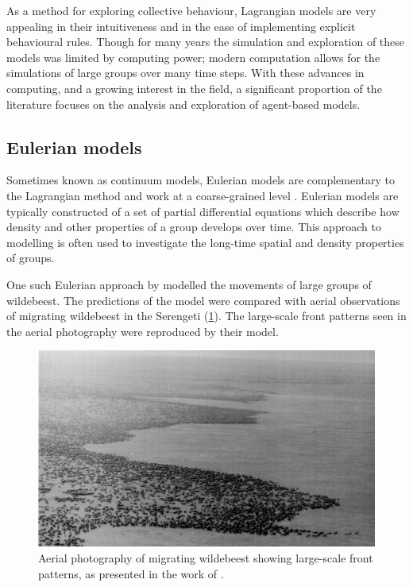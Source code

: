 As a method for exploring collective behaviour, Lagrangian models are very
appealing in their intuitiveness and in the ease of implementing explicit
behavioural rules. Though for many years the simulation and exploration of
these models was limited by computing power; modern computation allows for the
simulations of large groups over many time steps. With these advances in
computing, and a growing interest in the field, a significant proportion of the
literature focuses on the analysis and exploration of agent-based models.

\subsection{Eulerian models}
\label{ssec:eulerian_models}

Sometimes known as continuum models, Eulerian models are complementary to the
Lagrangian method and work at a coarse-grained level \parencite{giardina08}.
Eulerian models are typically constructed of a set of partial differential
equations which describe how density and other properties of a group develops
over time. This approach to modelling is often used to investigate the
long-time spatial and density properties of groups.

One such Eulerian approach by \textcite{gueron93} modelled the movements of
large groups of wildebeest. The predictions of the model were compared with
aerial observations of migrating wildebeest in the Serengeti
(\cref{fig:wildebeest}). The large-scale front patterns seen in the aerial
photography were reproduced by their model.

\begin{figure}[tb]
  \includegraphics[width=\textwidth]{wildebeest.png}
  \caption{Aerial photography of migrating wildebeest showing large-scale
    front patterns, as presented in the work of \textcite{gueron93}.}
  \label{fig:wildebeest}
\end{figure}


